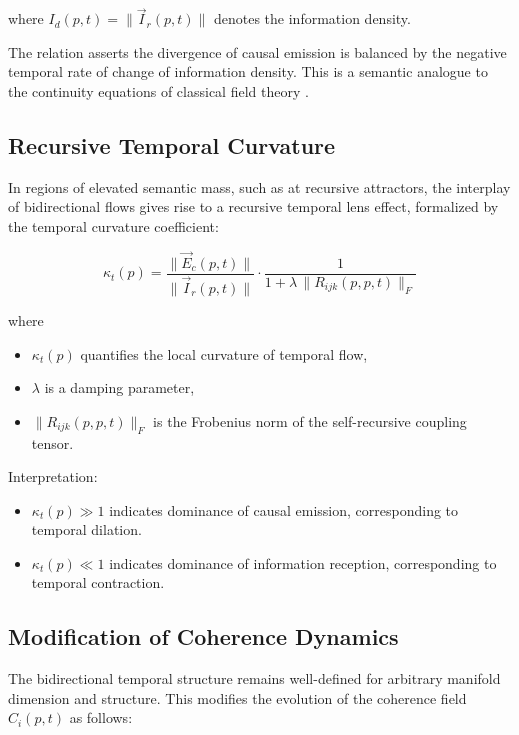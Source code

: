 where \(I_d(p,t) = \|\vec{I}_r(p,t)\|\) denotes the information density.

The relation asserts the divergence of causal emission is balanced by the negative temporal rate of change of information density. This is a semantic analogue to the continuity equations of classical field theory \autocite{Ryder1996, PeskinSchroeder1995}.

\subsection{Recursive Temporal Curvature}

In regions of elevated semantic mass, such as at recursive attractors, the interplay of bidirectional flows gives rise to a recursive temporal lens effect, formalized by the temporal curvature coefficient:

\begin{equation}
\kappa_t(p) = \frac{\|\vec{E}_c(p,t)\|}{\|\vec{I}_r(p,t)\|} \cdot \frac{1}{1 + \lambda\, \|R_{ijk}(p,p,t)\|_F}
\end{equation}

where
\begin{itemize}
    \item \(\kappa_t(p)\) quantifies the local curvature of temporal flow,
    \item \(\lambda\) is a damping parameter,
    \item \(\|R_{ijk}(p,p,t)\|_F\) is the Frobenius norm of the self-recursive coupling tensor.
\end{itemize}

Interpretation:
\begin{itemize}
    \item \(\kappa_t(p) \gg 1\) indicates dominance of causal emission, corresponding to temporal dilation.
    \item \(\kappa_t(p) \ll 1\) indicates dominance of information reception, corresponding to temporal contraction.
\end{itemize}

\subsection{Modification of Coherence Dynamics}

The bidirectional temporal structure remains well-defined for arbitrary manifold dimension and structure. This modifies the evolution of the coherence field \(C_i(p,t)\) as follows:

